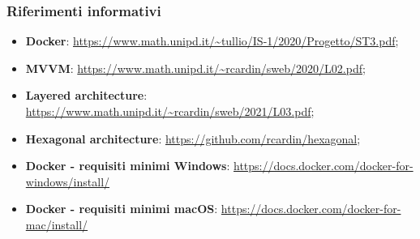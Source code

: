 	\subsubsection{Riferimenti informativi}
	\begin{itemize}
		\item \textbf{Docker}: \url{https://www.math.unipd.it/~tullio/IS-1/2020/Progetto/ST3.pdf};
		\item \textbf{MVVM}: \url{https://www.math.unipd.it/~rcardin/sweb/2020/L02.pdf};
		\item \textbf{Layered architecture}: \url{https://www.math.unipd.it/~rcardin/sweb/2021/L03.pdf};
		\item \textbf{Hexagonal architecture}: \url{https://github.com/rcardin/hexagonal};
		\item \textbf{Docker - requisiti minimi Windows}: \url{https://docs.docker.com/docker-for-windows/install/}
		\item \textbf{Docker - requisiti minimi macOS}: \url{https://docs.docker.com/docker-for-mac/install/}
	\end{itemize}

